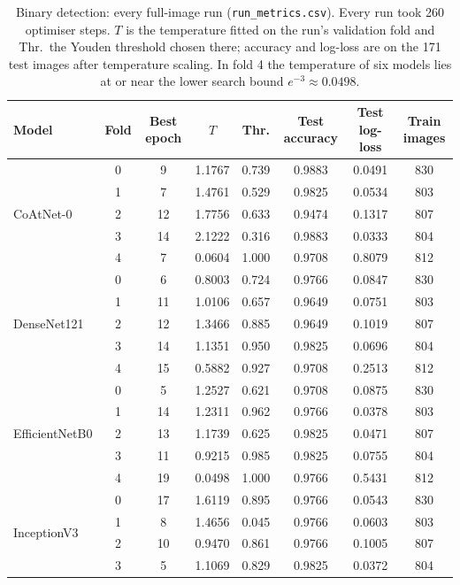 \documentclass[11pt]{article}
\begin{document}
\begin{table}[htbp]
\centering
\caption{Binary detection: every full-image run (\texttt{run\_metrics.csv}). Every run took 260 optimiser steps. $T$ is the temperature fitted on the run's validation fold and Thr.\ the Youden threshold chosen there; accuracy and log-loss are on the 171 test images after temperature scaling. In fold 4 the temperature of six models lies at or near the lower search bound $e^{-3}\approx 0.0498$.}
\scriptsize
\begin{tabular*}{\textwidth}{@{\extracolsep{\fill}}lccccccc@{}}
\toprule
Model & Fold & Best epoch & $T$ & Thr. & Test accuracy & Test log-loss & Train images \\
\midrule
\multirow{5}{*}{CoAtNet-0} & 0 & 9 & 1.1767 & 0.739 & 0.9883 & 0.0491 & 830 \\
 & 1 & 7 & 1.4761 & 0.529 & 0.9825 & 0.0534 & 803 \\
 & 2 & 12 & 1.7756 & 0.633 & 0.9474 & 0.1317 & 807 \\
 & 3 & 14 & 2.1222 & 0.316 & 0.9883 & 0.0333 & 804 \\
 & 4 & 7 & 0.0604 & 1.000 & 0.9708 & 0.8079 & 812 \\
\midrule
\multirow{5}{*}{DenseNet121} & 0 & 6 & 0.8003 & 0.724 & 0.9766 & 0.0847 & 830 \\
 & 1 & 11 & 1.0106 & 0.657 & 0.9649 & 0.0751 & 803 \\
 & 2 & 12 & 1.3466 & 0.885 & 0.9649 & 0.1019 & 807 \\
 & 3 & 14 & 1.1351 & 0.950 & 0.9825 & 0.0696 & 804 \\
 & 4 & 15 & 0.5882 & 0.927 & 0.9708 & 0.2513 & 812 \\
\midrule
\multirow{5}{*}{EfficientNetB0} & 0 & 5 & 1.2527 & 0.621 & 0.9708 & 0.0875 & 830 \\
 & 1 & 14 & 1.2311 & 0.962 & 0.9766 & 0.0378 & 803 \\
 & 2 & 13 & 1.1739 & 0.625 & 0.9825 & 0.0471 & 807 \\
 & 3 & 11 & 0.9215 & 0.985 & 0.9825 & 0.0755 & 804 \\
 & 4 & 19 & 0.0498 & 1.000 & 0.9766 & 0.5431 & 812 \\
\midrule
\multirow{5}{*}{InceptionV3} & 0 & 17 & 1.6119 & 0.895 & 0.9766 & 0.0543 & 830 \\
 & 1 & 8 & 1.4656 & 0.045 & 0.9766 & 0.0603 & 803 \\
 & 2 & 10 & 0.9470 & 0.861 & 0.9766 & 0.1005 & 807 \\
 & 3 & 5 & 1.1069 & 0.829 & 0.9825 & 0.0372 & 804 \\

\end{tabular*}
\end{table}
\end{document}
